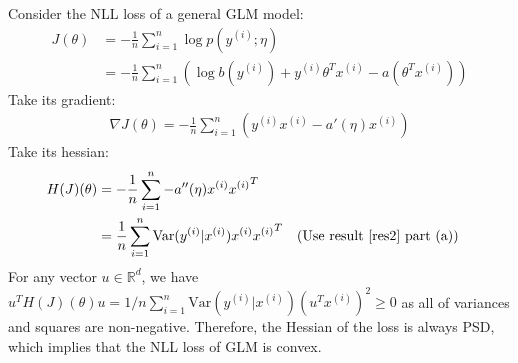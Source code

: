\begin{answer}
Consider the NLL loss of a general GLM model:
\begin{align}
	J(\theta) &= - \frac{1}{n} \sum \limits_{i = 1}^{n} \log p(y^{(i)}; \eta) \\
	&= - \frac{1}{n} \sum \limits_{i = 1}^{n} \left( \log b(y^{(i)}) + y^{(i)} \theta^T x^{(i)} - a(\theta^T x^{(i)}) \right)
\end{align}
Take its gradient:
\begin{align}
	\nabla J(\theta) = - \frac{1}{n} \sum \limits_{i = 1}^{n} \left(y^{(i)} x^{(i)} - a'(\eta) x^{(i)} \right)
\end{align}
Take its hessian:
\begin{align}
	H(J)(\theta) &= - \frac{1}{n} \sum \limits_{i = 1}^{n} -a''(\eta) x^{(i)} {x^{(i)}}^T \\
	&= \frac{1}{n} \sum \limits_{i = 1}^{n} \text{Var}(y^{(i)}|x^{(i)}) x^{(i)} {x^{(i)}}^T && \text{(Use result \eqref{res2} part (a))}
\end{align}
For any vector $u \in \mathbb{R}^d$, we have $u^T H(J)(\theta) u = 1/n \sum _{i = 1}^{n} \text{Var}(y^{(i)}|x^{(i)}) (u^T x^{(i)})^2 \ge 0$ as all of variances and squares are non-negative. Therefore, the Hessian of the loss is always PSD, which implies that the NLL loss of GLM is convex. \\
\end{answer}
